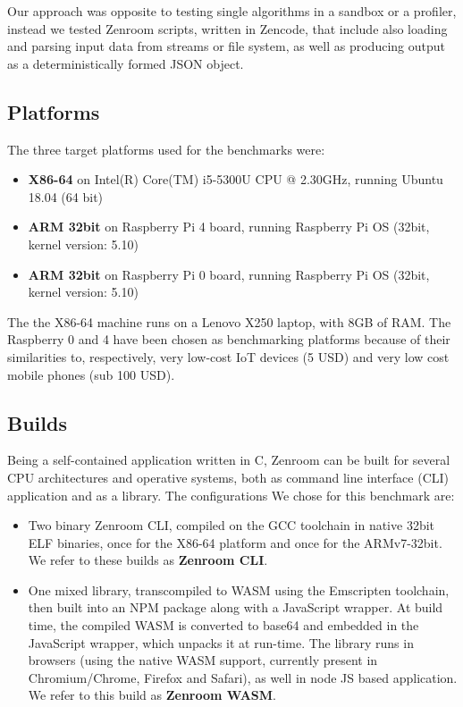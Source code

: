 \documentclass[twocolumn]{article}
\begin{document}
Our approach was opposite to testing single algorithms in a sandbox or a profiler, instead we tested Zenroom scripts, written in Zencode, that include also loading and parsing input data from streams or file system, as well as producing output as a deterministically formed JSON object. 

\subsection*{Platforms}
The three target platforms used for the benchmarks were: 
\begin{itemize}
  \item   \textbf{X86-64} on Intel(R) Core(TM) i5-5300U CPU @ 2.30GHz, running Ubuntu 18.04 (64 bit)
  \item   \textbf{ARM 32bit} on Raspberry Pi 4 board, running Raspberry Pi OS (32bit, kernel version: 5.10)
  \item  \textbf{ARM 32bit} on Raspberry Pi 0 board, running Raspberry Pi OS (32bit, kernel version: 5.10)
\end{itemize}

The the X86-64 machine runs on a Lenovo X250 laptop, with 8GB of RAM.  
The Raspberry 0 and 4 have been chosen as benchmarking platforms because of their similarities to, respectively, very low-cost IoT devices (5 USD) and very low cost mobile phones (sub 100 USD).

\subsection*{Builds} 

Being a self-contained application written in C, Zenroom can be built for several CPU architectures and operative systems, both as command line interface (CLI) application and as a library. The configurations We chose for this benchmark are: 

\begin{itemize}
\item Two binary Zenroom CLI, compiled on the GCC toolchain in native 32bit ELF binaries, once for the X86-64 platform and once for the ARMv7-32bit. We refer to these builds as \textbf{Zenroom CLI}. 

\item One mixed library, transcompiled to WASM using the Emscripten toolchain, then built into an NPM package along with a JavaScript wrapper. At build time, the compiled WASM is converted to base64 and embedded in the JavaScript wrapper, which unpacks it at run-time. 
The library runs in browsers (using the native WASM support, currently present in Chromium/Chrome, Firefox and Safari), as well in node JS based application. We refer to this build as \textbf{Zenroom WASM}. 
\end{itemize}
\end{document}

